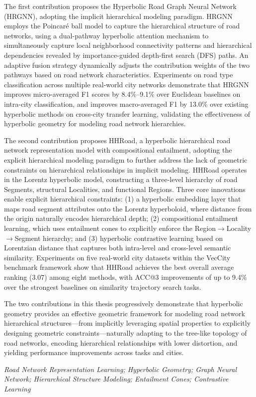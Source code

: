 The first contribution proposes the Hyperbolic Road Graph Neural Network (HRGNN), adopting the implicit hierarchical modeling paradigm. HRGNN employs the Poincar\'{e} ball model to capture the hierarchical structure of road networks, using a dual-pathway hyperbolic attention mechanism to simultaneously capture local neighborhood connectivity patterns and hierarchical dependencies revealed by importance-guided depth-first search (DFS) paths. An adaptive fusion strategy dynamically adjusts the contribution weights of the two pathways based on road network characteristics. Experiments on road type classification across multiple real-world city networks demonstrate that HRGNN improves micro-averaged F1 scores by 8.4\%--9.1\% over Euclidean baselines on intra-city classification, and improves macro-averaged F1 by 13.0\% over existing hyperbolic methods on cross-city transfer learning, validating the effectiveness of hyperbolic geometry for modeling road network hierarchies.

The second contribution proposes HHRoad, a hyperbolic hierarchical road network representation model with compositional entailment, adopting the explicit hierarchical modeling paradigm to further address the lack of geometric constraints on hierarchical relationships in implicit modeling. HHRoad operates in the Lorentz hyperbolic model, constructing a three-level hierarchy of road Segments, structural Localities, and functional Regions. Three core innovations enable explicit hierarchical constraints: (1) a hyperbolic embedding layer that maps road segment attributes onto the Lorentz hyperboloid, where distance from the origin naturally encodes hierarchical depth; (2) compositional entailment learning, which uses entailment cones to explicitly enforce the Region$\to$Locality$\to$Segment hierarchy; and (3) hyperbolic contrastive learning based on Lorentzian distance that captures both intra-level and cross-level semantic similarity. Experiments on five real-world city datasets within the VecCity benchmark framework show that HHRoad achieves the best overall average ranking (3.07) among eight methods, with ACC@3 improvements of up to 9.4\% over the strongest baselines on similarity trajectory search tasks.

The two contributions in this thesis progressively demonstrate that hyperbolic geometry provides an effective geometric framework for modeling road network hierarchical structures---from implicitly leveraging spatial properties to explicitly designing geometric constraints---naturally adapting to the tree-like topology of road networks, encoding hierarchical relationships with lower distortion, and yielding performance improvements across tasks and cities.

\vspace{0.5cm}
\hspace{-1cm}
{\bf{}} \textit{Road Network Representation Learning; Hyperbolic Geometry; Graph Neural Network; Hierarchical Structure Modeling; Entailment Cones; Contrastive Learning}